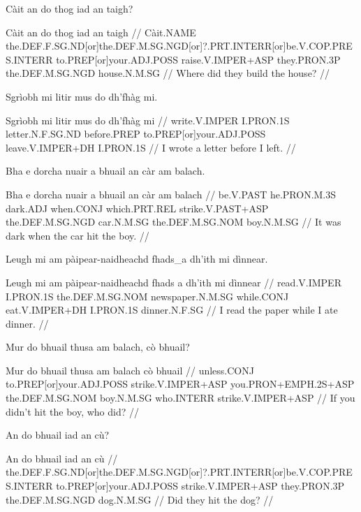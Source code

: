 \documentclass[a4paper,10pt]{article}
\begin{document}
\ex
\begingl
\glpre Càit an do thog iad an taigh? 

\vspace{4mm}
\gla Càit an do thog iad an taigh  //
\glb Càit.NAME the.DEF.F.SG.ND[or]the.DEF.M.SG.NGD[or]?.PRT.INTERR[or]be.V.COP.PRES.INTERR to.PREP[or]your.ADJ.POSS raise.V.IMPER+ASP they.PRON.3P the.DEF.M.SG.NGD house.N.M.SG  //
\glft Where did they build the house? //
\endgl
\xe

\ex
\begingl
\glpre Sgrìobh mi litir mus do dh'fhàg mi. 

\vspace{4mm}
\gla Sgrìobh mi litir mus do dh'fhàg mi  //
\glb write.V.IMPER I.PRON.1S letter.N.F.SG.ND before.PREP to.PREP[or]your.ADJ.POSS leave.V.IMPER+DH I.PRON.1S  //
\glft I wrote a letter before I left. //
\endgl
\xe

\ex
\begingl
\glpre Bha e dorcha nuair a bhuail an càr am balach. 

\vspace{4mm}
\gla Bha e dorcha nuair a bhuail an càr am balach  //
\glb be.V.PAST he.PRON.M.3S dark.ADJ when.CONJ which.PRT.REL strike.V.PAST+ASP the.DEF.M.SG.NGD car.N.M.SG the.DEF.M.SG.NOM boy.N.M.SG  //
\glft It was dark when the car hit the boy. //
\endgl
\xe

\ex
\begingl
\glpre Leugh mi am pàipear-naidheachd fhads\_a dh'ith mi dìnnear. 

\vspace{4mm}
\gla Leugh mi am pàipear-naidheachd {fhads a} dh'ith mi dìnnear  //
\glb read.V.IMPER I.PRON.1S the.DEF.M.SG.NOM newspaper.N.M.SG while.CONJ eat.V.IMPER+DH I.PRON.1S dinner.N.F.SG  //
\glft I read the paper while I ate dinner. //
\endgl
\xe

\ex
\begingl
\glpre Mur do bhuail thusa am balach, cò bhuail? 

\vspace{4mm}
\gla Mur do bhuail thusa am balach cò bhuail  //
\glb unless.CONJ to.PREP[or]your.ADJ.POSS strike.V.IMPER+ASP you.PRON+EMPH.2S+ASP the.DEF.M.SG.NOM boy.N.M.SG who.INTERR strike.V.IMPER+ASP  //
\glft If you didn't hit the boy, who did? //
\endgl
\xe

\ex
\begingl
\glpre An do bhuail iad an cù? 

\vspace{4mm}
\gla An do bhuail iad an cù  //
\glb the.DEF.F.SG.ND[or]the.DEF.M.SG.NGD[or]?.PRT.INTERR[or]be.V.COP.PRES.INTERR to.PREP[or]your.ADJ.POSS strike.V.IMPER+ASP they.PRON.3P the.DEF.M.SG.NGD dog.N.M.SG  //
\glft Did they hit the dog? //
\endgl
\xe
\end{document}

